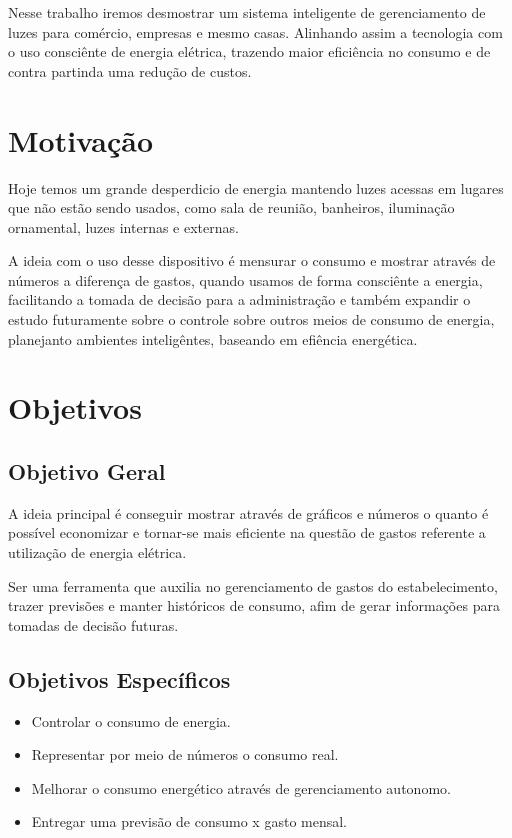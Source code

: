 \documentclass[openright]{normas-utf-tex} %
\begin{document}
Nesse trabalho iremos desmostrar um sistema inteligente de gerenciamento de luzes para comércio, empresas e mesmo casas. Alinhando assim a tecnologia com o uso consciênte de energia elétrica, trazendo maior eficiência no consumo e de contra partinda uma redução de custos.

\section{Motivação}

Hoje temos um grande desperdicio de energia mantendo luzes acessas em lugares que não estão sendo usados, como sala de reunião, banheiros, iluminação ornamental, luzes internas e externas.

A ideia com o uso desse dispositivo é mensurar o consumo e mostrar através de números a diferença de gastos, quando usamos de forma consciênte a energia, facilitando a tomada de decisão para a administração e também expandir o estudo futuramente sobre o controle sobre outros meios de consumo de energia, planejanto ambientes inteligêntes, baseando em efiência energética.

\section{Objetivos}

\subsection{Objetivo Geral}

A ideia principal é conseguir mostrar através de gráficos e números o quanto é possível economizar e tornar-se mais eficiente na questão de gastos referente a utilização de energia elétrica.

Ser uma ferramenta que auxilia no gerenciamento de gastos do estabelecimento, trazer previsões e manter históricos de consumo, afim de gerar informações para tomadas de decisão futuras.

\subsection{Objetivos Específicos}

\begin{itemize}
	\item Controlar o consumo de energia.
	\item Representar por meio de números o consumo real. 
	\item Melhorar o consumo energético através de gerenciamento autonomo.
	\item Entregar uma previsão de consumo x gasto mensal.
\end{itemize}
\end{document}
